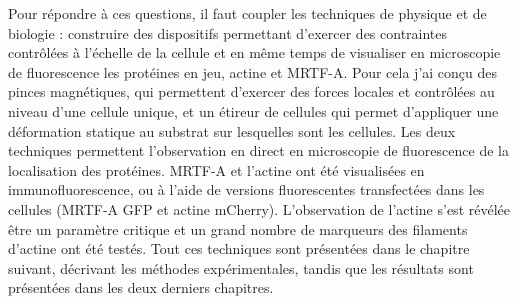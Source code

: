 Pour répondre à ces questions, il faut coupler les techniques de physique et de biologie : construire des dispositifs permettant d'exercer des contraintes contrôlées à l'échelle de la cellule et en même temps de visualiser en microscopie de fluorescence les protéines en jeu, actine et MRTF-A. 
Pour cela j'ai conçu des pinces magnétiques, qui permettent d'exercer des forces locales et contrôlées au niveau d'une cellule unique, et un étireur de cellules qui permet d'appliquer une déformation statique au substrat sur lesquelles sont les cellules. 
Les deux techniques permettent l'observation en direct en microscopie de fluorescence de la localisation des protéines. 
MRTF-A et l'actine ont été visualisées en immunofluorescence, ou à l'aide de versions fluorescentes transfectées dans les cellules (MRTF-A GFP et actine mCherry). L'observation de l'actine s'est révélée être un paramètre critique et un grand nombre de marqueurs des filaments d'actine ont été testés. 
Tout ces techniques sont présentées dans le chapitre suivant, décrivant les méthodes expérimentales, tandis que les résultats sont présentées dans les deux derniers chapitres. 
%
